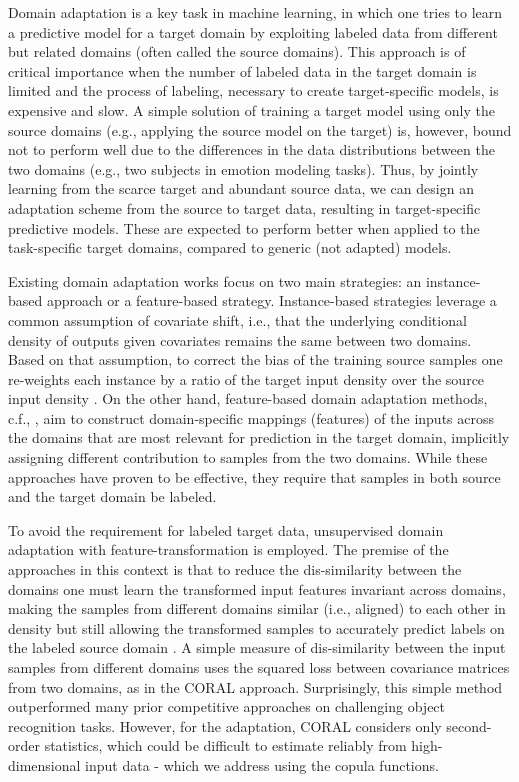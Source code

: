 \documentclass{article}
\begin{document}
	
	Domain adaptation is a key task in machine learning, in which one tries to learn a predictive model for a target domain by exploiting labeled data from different but related domains (often called the source domains). This approach is of critical importance when the number of labeled data in the target domain is limited and the process of labeling, necessary to create target-specific models, is expensive and slow. A simple solution of training a target model using only the source domains (e.g., applying the source model on the target) is, however, bound not to perform well due to the differences in the data distributions between the two domains (e.g., two subjects in emotion modeling tasks). Thus, by jointly learning from the scarce target and abundant source data, we can design an adaptation scheme from the source to target data, resulting in target-specific predictive models. These are expected to perform better when applied to the task-specific target domains, compared to generic (not adapted) models. 
	
	Existing domain adaptation works focus on two main strategies: an instance-based approach or a feature-based strategy. Instance-based strategies leverage a common assumption of covariate shift, i.e., that the underlying conditional density of outputs given covariates remains the same between two domains.  Based on that assumption, to correct the bias of the training source samples one re-weights each instance by a ratio of the target input density over the  source input density \cite{DBLP:conf/nips/KanamoriHS08,Shimodaira2000227,DBLP:conf/icassp/YamadaSM09}.  On the other hand, feature-based domain adaptation methods, c.f., \cite{Daume:2010:FES:1870526.1870534}, aim to construct domain-specific mappings (features) of the inputs across the domains that are most relevant for prediction in the target domain, implicitly assigning different contribution to samples from the two domains. While these approaches have proven to be effective, they require that samples in both source and the target domain be labeled.
	
	To avoid the requirement for labeled target data, unsupervised domain adaptation with feature-transformation is employed. The premise of the approaches in this context is that to reduce the dis-similarity between the domains one must learn the transformed input features invariant across domains, making the samples from different domains similar (i.e., aligned) to each other in density but still allowing the transformed samples to accurately predict labels on the labeled source domain \cite{DBLP:conf/iccv/BaktashmotlaghHLS13,DBLP:journals/tnn/PanTKY11}.  A simple measure of dis-similarity between the input samples from different domains uses the squared loss between covariance matrices from two domains, as in the CORAL \cite{DBLP:journals/corr/SunFS15} approach. Surprisingly, this simple method outperformed many prior competitive approaches on challenging object recognition tasks. However, for the adaptation, CORAL considers only second-order statistics, which could be difficult to estimate reliably from high-dimensional input data - which we address using the copula functions. 
    
\end{document}
